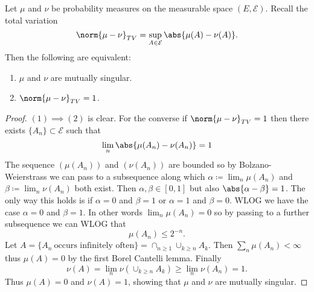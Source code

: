 \documentclass[fontsize=12pt, DIV=10]{scrreprt}
\theoremstyle{remark}
\newcommand{\defeq}{\coloneqq}
\newcommand{\calE}{\mathcal E}
\begin{document}
\begin{prop}
	Let $\mu$ and $\nu$ be probability measures on the measurable space $(E, \calE)$. Recall the total variation
	\begin{equation}
		\norm{\mu - \nu}_{TV} = \sup_{A \in \calE} \abs{\mu(A) - \nu(A)}.
	\end{equation}
	Then the following are equivalent:
	\begin{enumerate}
		\item $\mu$ and $\nu$ are mutually singular.
		\item $\norm{\mu - \nu}_{TV} = 1$.
	\end{enumerate}
\end{prop}
\begin{proof}
	$(1) \implies (2)$ is clear. For the converse if $\norm{\mu - \nu}_{TV} = 1$ then there exists $\{A_n\} \subset \calE$ such that
	\begin{equation}
		\lim_n \abs{\mu(A_n) - \nu(A_n)} = 1
	\end{equation}
	The sequence $(\mu(A_n))$ and $(\nu(A_n))$ are bounded so by Bolzano-Weierstrass we can pass to a subsequence along which $\alpha \defeq \lim_n \mu(A_n)$ and $\beta \defeq \lim_n \nu(A_n)$ both exist. Then $\alpha, \beta \in [0, 1]$ but also $\abs{\alpha - \beta} = 1$. The only way this holds is if $\alpha = 0$ and $\beta = 1$ or $\alpha = 1$ and $\beta = 0$. WLOG we have the case $\alpha = 0$ and $\beta = 1$. In other words $\lim_n \mu(A_n) = 0$ so by passing to a further subsequence we can WLOG that
	\begin{equation}
		\mu(A_n) \leq 2^{-n}.
	\end{equation}
	Let $A = \{A_n\ \text{occurs infinitely often}\} = \cap_{n \geq 1} \cup_{k \geq n} A_k$. Then $\sum_n \mu(A_n) < \infty$ thus $\mu(A) = 0$ by the first Borel Cantelli lemma. Finally
	 \begin{equation}
		 \nu(A) = \lim_n \nu(\cup_{k \geq n} A_k) \geq \lim_n \nu(A_n) = 1.
	 \end{equation}
	 Thus $\mu(A) = 0$ and $\nu(A) = 1$, showing that $\mu$ and $\nu$ are mutually singular.
\end{proof}

\printbibliography
\end{document}
